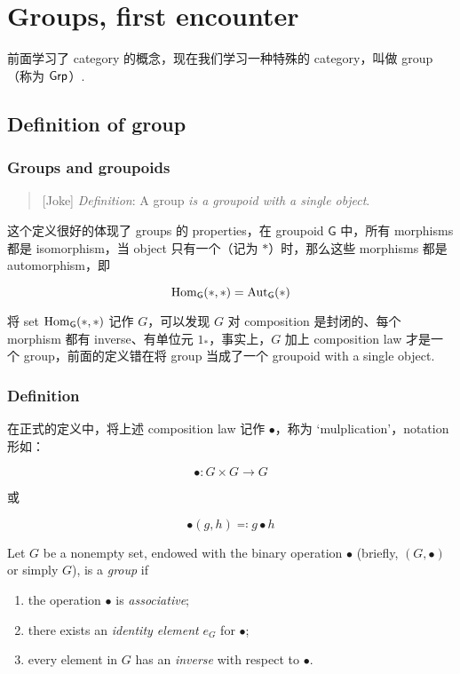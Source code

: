 \chapter{Groups, first encounter}

前面学习了 category 的概念，现在我们学习一种特殊的 category，叫做 group（称为 \(\operatorname{\mathsf{Grp}}\)）.

\section{Definition of group}\label{sec:2.1}

\subsection{Groups and groupoids}\label{sec:2.1.1}

\begin{quote}[Joke]
    \emph{Definition}: A group \emph{is a groupoid with a single object}.
\end{quote}

这个定义很好的体现了 groups 的 properties，在 groupoid \(\mathsf{G}\) 中，所有 morphisms 都是 isomorphism，当 object 只有一个（记为 \(*\)）时，那么这些 morphisms 都是 automorphism，即

\[\operatorname{Hom}_{\sf{G}}(*, *) = \operatorname{Aut}_{\sf{G}}(*)\]

将 set \(\operatorname{Hom}_{\sf{G}}(*, *)\) 记作 \(G\)，可以发现 \(G\) 对 composition 是封闭的、每个 morphism 都有 inverse、有单位元 \(1_{*}\)，事实上，\(G\) 加上 composition law 才是一个 group，前面的定义错在将 group 当成了一个 groupoid with a single object.

\subsection{Definition}\label{sec:2.1.2}

在正式的定义中，将上述 composition law 记作 \(\bullet\)，称为 `mulplication'，notation 形如：

\[\bullet \colon G \times G \to G\]

或

\[\bullet(g, h) \eqqcolon g \bullet h\]

\begin{definition}[Group]\label{def:group}
    Let \(G\) be a nonempty set, endowed with the binary operation \(\bullet\) (briefly, \((G, \bullet)\) or simply \(G\)), is a \emph{group} if
    \begin{enumerate}
        \item the operation \(\bullet\) is \emph{associative};
        \item there exists an \emph{identity element} \(e_{G}\) for \(\bullet\);
        \item every element in \(G\) has an \emph{inverse} with respect to \(\bullet\).
    \end{enumerate}
\end{definition}

